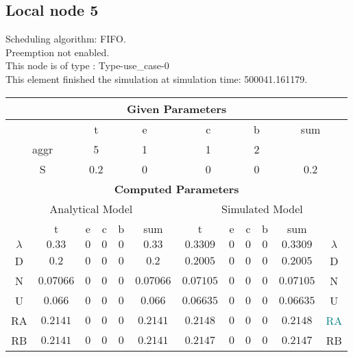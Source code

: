 \documentclass{article}
\begin{document}
\subsection{Local node 5}
Scheduling algorithm: FIFO.\\Preemption not enabled. \\This node is of type : Type-use\_case-0\\
This element finished the simulation at simulation time: 500041.161179.\\
\begin{table}[H]\centering\begin{tabular}{@{}c|cccc|c||cccc|c|c@{}}\toprule\multicolumn{12}{c}{\textbf{Given Parameters}}\\\midrule\multicolumn{2}{c|}{ } & \multicolumn{2}{c}{t} & \multicolumn{2}{c}{e} & \multicolumn{2}{c}{c} & \multicolumn{2}{c}{b} & \multicolumn{2}{|c}{sum} \\\midrule\multicolumn{2}{c|}{aggr} & \multicolumn{2}{c}{5} & \multicolumn{2}{c}{1} & \multicolumn{2}{c}{1} & \multicolumn{2}{c}{2} & \multicolumn{2}{|c}{ } \\ \midrule\multicolumn{2}{c|}{S} & \multicolumn{2}{c}{0.2} & \multicolumn{2}{c}{0} & \multicolumn{2}{c}{0} & \multicolumn{2}{c}{0} & \multicolumn{2}{|c}{0.2}\\ \midrule\midrule\multicolumn{12}{c}{\textbf{Computed Parameters}}\\ \midrule\multicolumn{6}{c||}{Analytical Model} & \multicolumn{6}{c}{Simulated Model}\\ 
 \midrule & t & e & c & b & sum & t & e & c & b & sum &  \\ \midrule$\lambda$ &$0.33$ & $0$ & $0$ & $0$ & $0.33$ & $0.3309$ & $0$ & $0$ & $0$ & $0.3309$& $\lambda$ \\D & $0.2$ & $0$ & $0$ & $0$ & $0.2$ & $0.2005$ & $0$ & $0$ & $0$ & $0.2005$& D\\N & $0.07066$ & $0$ & $0$ & $0$ & $0.07066$ & $0.07105$ & $0$ & $0$ & $0$ & $0.07105$& N\\U & $0.066$ & $0$ & $0$ & $0$ & $0.066$ & $0.06635$ & $0$ & $0$ & $0$ & $0.06635$& U\\RA & $0.2141$ & $0$ & $0$ & $0$ & $0.2141$ & $0.2148$ & $0$ & $0$ & $0$ & $0.2148$& \textcolor{teal}{RA}\\RB & $0.2141$ & $0$ & $0$ & $0$ & $0.2141$ & $0.2147$ & $0$ & $0$ & $0$ & $0.2147$& RB\\
\bottomrule
\end{tabular}
\end{table}
\filbreak
\end{document}

